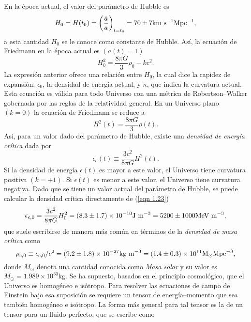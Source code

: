 \documentclass[a4paper,openright,10pt, oneside, final]{book}
\begin{document}
En la época actual, el valor del parámetro de Hubble es
\begin{equation}
H_{0} = H(t_{0}) = \left(\frac{\dot{a}}{a}\right) 
_{t=t_{0}} = 70 \pm 7 \textup{km s}^{-1} \textup{Mpc}^{-1},\label{eqn 1.20}
\end{equation}
a esta cantidad $H_{0}$ se le conoce como constante de Hubble. Así, la ecuación de Friedmann en la época actual es $(a(t) = 1)$ 
\begin{equation}
H_{0}^{2} = \frac{8 \pi G}{3}\rho_{0} 
-k c^{2}. \label{eqn 1.21}
\end{equation}
La expresión anterior ofrece una relación entre $H_{0}$, la cual dice la rapidez de expansión, $\epsilon_{0}$, la densidad de energía actual, y $\kappa$, que indica la curvatura actual. Esta ecuación es válida para todo Universo con una métrica de Robertson--Walker gobernada por las reglas de la relatividad general. En un Universo plano $(k = 0)$ la ecuación de Friedmann se reduce a
\begin{equation}
H^{2}(t)=\frac{8 \pi G}{3}\rho(t).\label{eqn 1.22}
\end{equation}
Así, para un valor dado del parámetro de Hubble, existe una \textit{densidad de energía crítica} dada por
\begin{equation}
\epsilon_{c}(t) \equiv \frac{3 c^{2}}{8 \pi G} H^{2}(t).\label{eqn 1.23}
\end{equation}
Si la densidad de energía $\epsilon(t)$ es mayor a este valor, el Universo tiene curvatura positiva $(k = +1)$. Si $\epsilon(t)$ es menor a este valor, el Universo tiene curvatura negativa. Dado que se tiene un valor actual del parámetro de Hubble, se puede calcular la densidad crítica directamente de (\ref{eqn 1.23})
\begin{equation}
\epsilon_{c,0} = \frac{3 c^{2}}{8 \pi G}H_{0}^{2}
=
(8.3 \pm 1.7) \times 10^{-10} \textup{J m} ^{-3}
=
5200 \pm 1000 \textup{MeV m} ^{-3},\label{eqn 1.24}
\end{equation}
que suele escribirse de manera más común en términos de la \textit{densidad de masa crítica} como
\begin{equation}
\rho_{c,0} \equiv \epsilon_{c,0}/c^{2}
=
(9.2 \pm 1.8) \times 10^{-27} \textup{kg m}^{-3}
=
(1.4 \pm 0.3) \times 10^{11} \textup{M}_{\odot} \textup{Mpc}^{-3},\label{eqn 1.25}
\end{equation}
donde $M_{\odot}$ denota una cantidad conocida como \textit{Masa solar} y su valor es $M_{\odot} = 1.989 \times 10^{30}$kg. Se ha supuesto, basados en el principio cosmológico, que el Universo es homogéneo e isótropo. Para resolver las ecuaciones de campo de Einstein bajo esa suposición se requiere un tensor de energía--momento que sea también homogéneo e isótropo. La forma más general para tal tensor es la de un tensor para un fluido perfecto, que se escribe como \cite{1.2, 1.3}
\end{document}
